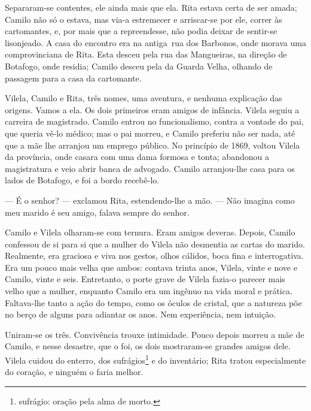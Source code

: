 Separaram-se contentes, ele ainda mais que ela. Rita estava certa de ser
amada; Camilo não só o estava, mas via-a estremecer e arriscar-se por
ele, correr às cartomantes, e, por mais que a repreendesse, não podia
deixar de sentir-se lisonjeado. A casa do encontro era na antiga~rua dos
Barbonos, onde morava uma comprovinciana de Rita. Esta desceu pela rua
das Mangueiras, na direção de Botafogo, onde residia; Camilo desceu pela
da Guarda Velha, olhando de passagem para a casa da cartomante.

Vilela, Camilo e Rita, três nomes, uma aventura, e nenhuma explicação
das origens. Vamos a ela. Os dois primeiros eram amigos de infância.
Vilela seguiu a carreira de magistrado. Camilo entrou no funcionalismo,
contra a vontade do pai, que queria vê-lo médico; mas o pai morreu, e
Camilo preferiu não ser nada, até que a mãe lhe arranjou um emprego
público. No princípio de 1869, voltou Vilela da província, onde casara
com uma dama formosa e tonta; abandonou a magistratura e veio abrir
banca de advogado. Camilo arranjou-lhe casa para os lados de Botafogo, e
foi a bordo recebê-lo.

--- É o senhor? --- exclamou Rita, estendendo-lhe a mão. --- Não imagina
como meu marido é seu amigo, falava sempre do senhor.

Camilo e Vilela olharam-se com ternura. Eram amigos deveras. Depois,
Camilo confessou de si para si que a mulher do Vilela não desmentia as
cartas do marido. Realmente, era graciosa e viva nos gestos, olhos
cálidos, boca fina e interrogativa. Era um pouco mais velha que ambos:
contava trinta anos, Vilela, vinte e nove e Camilo, vinte e seis.
Entretanto, o porte grave de Vilela fazia-o parecer mais velho que a
mulher, enquanto Camilo era um ingênuo na vida moral e prática.
Faltava-lhe tanto a ação do tempo, como os óculos de cristal, que a
natureza põe no berço de alguns para adiantar os anos. Nem experiência,
nem intuição.

Uniram-se os três. Convivência trouxe intimidade. Pouco depois morreu a
mãe de Camilo, e nesse desastre, que o foi, os dois mostraram-se grandes
amigos dele. Vilela cuidou do enterro, dos sufrágios\footnote{sufrágio:
  oração pela alma de morto.} e do inventário; Rita tratou especialmente
do coração, e ninguém o faria melhor.

